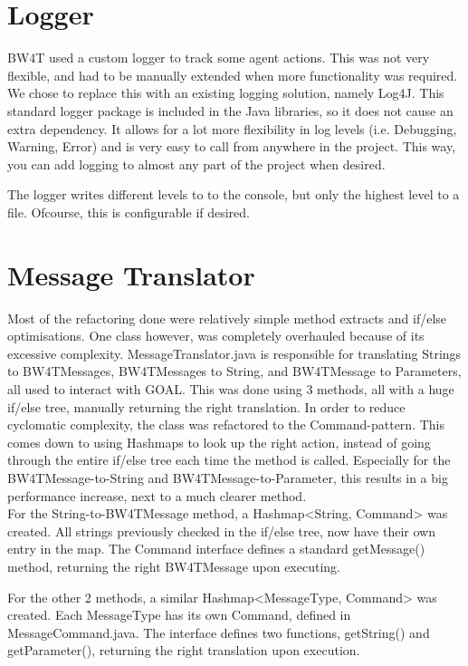 \section{Logger}
BW4T used a custom logger to track some agent actions. This was not very flexible, and had to be manually extended when more functionality was required. We chose to replace this with an existing logging solution, namely Log4J. This standard logger package is included in the Java libraries, so it does not cause an extra dependency. It allows for a lot more flexibility in log levels (i.e. Debugging, Warning, Error) and is very easy to call from anywhere in the project. This way, you can add logging to almost any part of the project when desired.

The logger writes different levels to to the console, but only the highest level to a file. Ofcourse, this is configurable if desired. 

\section{Message Translator}
Most of the refactoring done were relatively simple method extracts and if/else optimisations. One class however, was completely overhauled because of its excessive complexity. MessageTranslator.java is responsible for translating Strings to BW4TMessages, BW4TMessages to String, and BW4TMessage to Parameters, all used to interact with GOAL. This was done using 3 methods, all with a huge if/else tree, manually returning the right translation. In order to reduce cyclomatic complexity, the class was refactored to the Command-pattern. This comes down to using Hashmaps to look up the right action, instead of going through the entire if/else tree each time the method is called. Especially for the BW4TMessage-to-String and BW4TMessage-to-Parameter, this results in a big performance increase, next to a much clearer method. \\

For the String-to-BW4TMessage method, a Hashmap<String, Command> was created. All strings previously checked in the if/else tree, now have their own entry in the map. The Command interface defines a standard getMessage() method, returning the right BW4TMessage upon executing. 

For the other 2 methods, a similar Hashmap<MessageType, Command> was created. Each MessageType has its own Command, defined in MessageCommand.java. The interface defines two functions, getString() and getParameter(), returning the right translation upon execution. 

